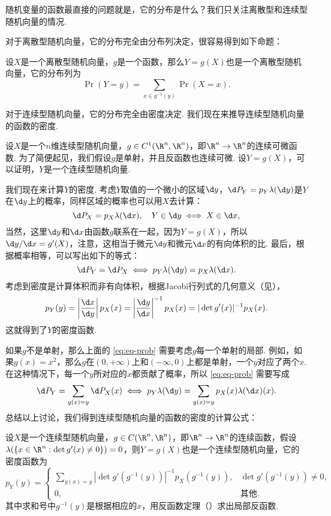 随机变量的函数最直接的问题就是，它的分布是什么？我们只关注离散型和连续型随机向量的情况.

对于离散型随机向量，它的分布完全由分布列决定，很容易得到如下命题：

\begin{theorem}\label{thm:discrete-function}
设$X$是一个离散型随机向量，$g$是一个函数，那么$Y=g(X)$也是一个离散型随机向量，它的分布列为
\[\Pr(Y=y)=\sum_{x\in g^{-1}(y)}\Pr(X=x).\]
\end{theorem}

对于连续型随机向量，它的分布完全由密度决定. 我们现在来推导连续型随机向量的函数的密度. 

设$X$是一个$n$维连续型随机向量，$g\in C^1(\R^n,\R^n)$，即$\R^n\to\R^n$的连续可微函数. 为了简便起见，我们假设$g$是单射，并且反函数也连续可微. 设$Y=g(X)$，可以证明，$Y$是一个连续型随机向量. 

我们现在来计算$Y$的密度. 考虑$Y$取值的一个微小的区域$\d y$，$\d P_Y=p_Y\lambda(\d y)$是$Y$在$\d y$上的概率，同样区域的概率也可以用$X$去计算：
\[\d P_X=p_X\lambda(\d x),\quad Y\in\d y\iff X\in\d x,\]
当然，这里$\d y$和$\d x$由函数$g$联系在一起，因为$Y=g(X)$，所以$\d y/\d x=g'(X)$，注意，这相当于微元$\d y$和微元$\d x$的有向体积的比. 最后，根据概率相等，可以写出如下的等式：
\begin{equation}
    \d P_Y=\d P_X\iff p_Y\lambda(\d y)=p_X\lambda(\d x).\label{eq:eq-prob}
\end{equation}
考虑到密度是计算体积而非有向体积，根据Jacobi行列式的几何意义（见），
\[p_Y(y)=\left|\frac{\d x}{\d y}\right|p_X(x)=\left|\frac{\d y}{\d x}\right|^{-1}p_X(x)=|\det g'(x)|^{-1}p_X(x).\]
这就得到了$Y$的密度函数. 

如果$g$不是单射，那么上面的 \eqref{eq:eq-prob} 需要考虑$g$每一个单射的局部. 例如，如果$g(x)=x^2$，那么$g$在$(0,+\infty)$上和$(-\infty,0)$上都是单射，一个$y$对应了两个$x$. 在这种情况下，每一个$y$所对应的$x$都贡献了概率，所以 \eqref{eq:eq-prob} 需要写成
\begin{equation}
    \d P_Y=\sum_{g(x)=y}\d P_X(x)\iff p_Y\lambda(\d y)=\sum_{g(x)=y}p_X(x)\lambda(\d x)(x).\label{eq:eq-prob-2}
\end{equation}
总结以上讨论，我们得到连续型随机向量的函数的密度的计算公式：

\begin{theorem}\label{thm:continuous-function}
设$X$是一个连续型随机向量，$g\in C(\R^n,\R^n)$，即$\R^n\to\R^n$的连续函数，假设$\lambda(\{x\in\R^n:\det g'(x)\neq 0\})=0$，则$Y=g(X)$也是一个连续型随机向量，它的密度函数为
\[p_Y(y)=\begin{cases}
    \sum_{g(x)=y}|\det g'(g^{-1}(y))|^{-1}p_X(g^{-1}(y)),&\det g'(g^{-1}(y))\neq 0,\\
    0,&\text{其他}.
\end{cases}\]
其中求和号中$g^{-1}(y)$是根据相应的$x$，用反函数定理（）求出局部反函数. 
\end{theorem}

